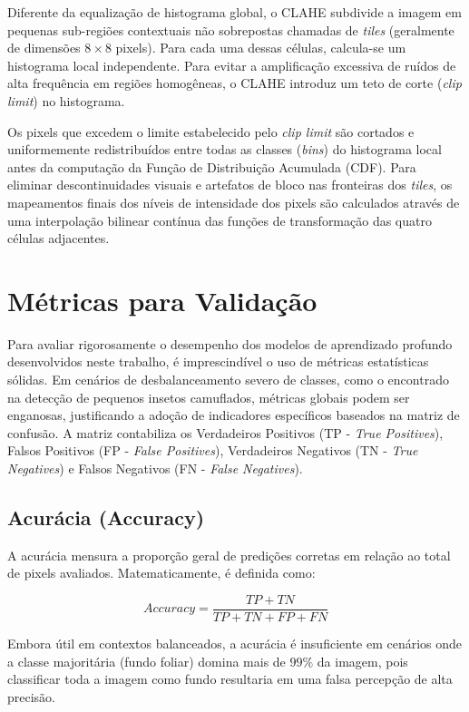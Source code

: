 Diferente da equalização de histograma global, o CLAHE subdivide a imagem em pequenas sub-regiões contextuais não sobrepostas chamadas de \textit{tiles} (geralmente de dimensões $8\times8$ pixels). Para cada uma dessas células, calcula-se um histograma local independente. Para evitar a amplificação excessiva de ruídos de alta frequência em regiões homogêneas, o CLAHE introduz um teto de corte (\textit{clip limit}) no histograma.

Os pixels que excedem o limite estabelecido pelo \textit{clip limit} são cortados e uniformemente redistribuídos entre todas as classes (\textit{bins}) do histograma local antes da computação da Função de Distribuição Acumulada (CDF). Para eliminar descontinuidades visuais e artefatos de bloco nas fronteiras dos \textit{tiles}, os mapeamentos finais dos níveis de intensidade dos pixels são calculados através de uma interpolação bilinear contínua das funções de transformação das quatro células adjacentes.

\section{Métricas para Validação}
\label{sec:metricas_validacao}

Para avaliar rigorosamente o desempenho dos modelos de aprendizado profundo desenvolvidos neste trabalho, é imprescindível o uso de métricas estatísticas sólidas. Em cenários de desbalanceamento severo de classes, como o encontrado na detecção de pequenos insetos camuflados, métricas globais podem ser enganosas, justificando a adoção de indicadores específicos baseados na matriz de confusão. A matriz contabiliza os Verdadeiros Positivos (TP - \textit{True Positives}), Falsos Positivos (FP - \textit{False Positives}), Verdadeiros Negativos (TN - \textit{True Negatives}) e Falsos Negativos (FN - \textit{False Negatives}).

\subsection{Acurácia (Accuracy)}
A acurácia mensura a proporção geral de predições corretas em relação ao total de pixels avaliados. Matematicamente, é definida como:

\begin{equation}
    Accuracy = \frac{TP + TN}{TP + TN + FP + FN}
\end{equation}

Embora útil em contextos balanceados, a acurácia é insuficiente em cenários onde a classe majoritária (fundo foliar) domina mais de $99\%$ da imagem, pois classificar toda a imagem como fundo resultaria em uma falsa percepção de alta precisão.

